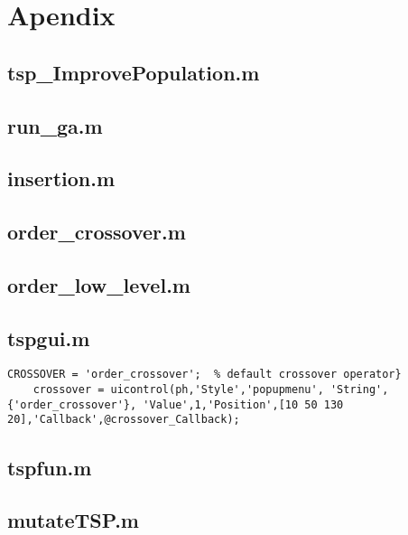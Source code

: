 

\section{Apendix}


\subsection{tsp\_ImprovePopulation.m}

\subsection{run\_ga.m}

\subsection{insertion.m}

\subsection{order\_crossover.m}

\subsection{order\_low\_level.m}

\subsection{tspgui.m}
    \begin{lstlisting}[frame=single]
    CROSSOVER = 'order_crossover';  % default crossover operator}
    crossover = uicontrol(ph,'Style','popupmenu', 'String',{'order_crossover'}, 'Value',1,'Position',[10 50 130 20],'Callback',@crossover_Callback);
    \end{lstlisting}
\subsection{tspfun.m}

\subsection{mutateTSP.m}




